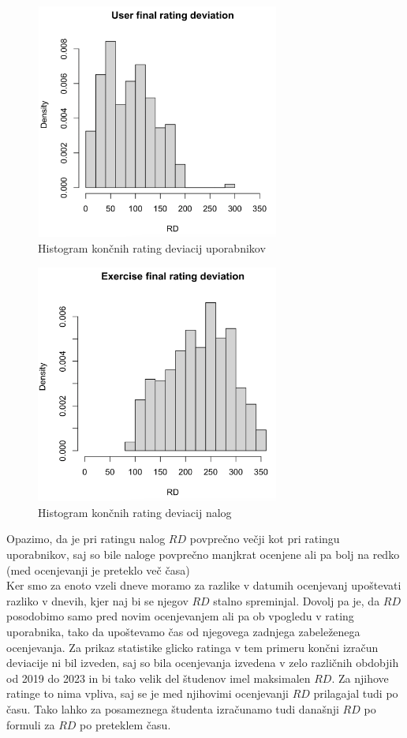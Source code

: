 \documentclass{IEEEtran}
\begin{document}
\begin{figure}[h!]
    \includegraphics[width=8cm]{RDUser}
    \caption{Histogram končnih rating deviacij uporabnikov}%
    \label{fig:example}%
\end{figure}
\begin{figure}[h!]
    \includegraphics[width=8cm]{RDExercise}
    \caption{Histogram končnih rating deviacij nalog}%
    \label{fig:example}%
\end{figure}

\newpage
Opazimo, da je pri ratingu nalog $RD$ povprečno večji kot pri ratingu uporabnikov, saj so bile naloge povprečno manjkrat ocenjene ali pa bolj na redko (med ocenjevanji je preteklo več časa)
\hfill
\\

Ker smo za enoto vzeli dneve moramo za razlike v datumih ocenjevanj upoštevati razliko v dnevih, kjer naj bi se njegov $RD$ stalno spreminjal. Dovolj pa je, da $RD$ posodobimo samo pred novim ocenjevanjem ali pa ob vpogledu v rating uporabnika, tako da upoštevamo čas od njegovega zadnjega zabeleženega ocenjevanja. Za prikaz statistike glicko ratinga v tem primeru končni izračun deviacije ni bil izveden, saj so bila ocenjevanja izvedena v zelo različnih obdobjih od 2019 do 2023 in bi tako velik del študenov imel maksimalen $RD$. Za njihove ratinge to nima vpliva, saj se je med njihovimi ocenjevanji $RD$ prilagajal tudi po času. Tako lahko za posameznega študenta izračunamo tudi današnji $RD$ po formuli za $RD$ po preteklem času. %
\end{document}
